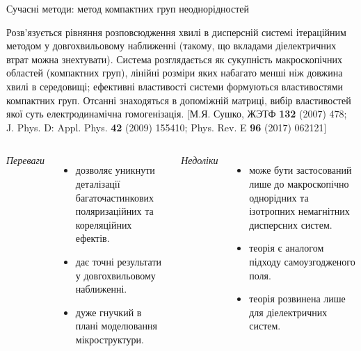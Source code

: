 \documentclass[10pt]{beamer}
\begin{document}
\begin{frame}{Сучасні методи: метод компактних груп неоднорідностей}

\footnotesize
    Розв'язується рівняння розповсюдження хвилі в дисперсній системі ітераційним методом у довгохвильовому наближенні (такому, що вкладами діелектричних втрат можна знехтувати).
    Система розглядається як сукупність макроскопічних областей (компактних груп), лінійні розміри яких набагато менші ніж довжина хвилі в середовищі; ефективні властивості системи формуються властивостями компактних груп.
    Отсанні знаходяться в допоміжній матриці, вибір властивостей якої суть електродинамічна гомогенізація.
    [М.Я. Сушко, ЖЭТФ {\bf 132} (2007) 478; J. Phys. D: Appl. Phys. {\bf 42} (2009) 155410; Phys. Rev. E {\bf 96} (2017) 062121]
    \vspace{-5pt}
    \begin{columns}[T,onlytextwidth]
          \begin{center}
          {\it Переваги}
          \end{center}
          \vspace{-10pt}
          \begin{itemize}
              \item дозволяє уникнути деталізації багаточастинкових поляризаційних та кореляційних ефектів.
              \item дає точні результати у довгохвильовому наближенні.
              \item дуже гнучкий в плані моделювання мікроструктури.
          \end{itemize}
    
          \begin{center}
          {\it Недоліки}
          \end{center}
          \vspace{-10pt}
          \begin{itemize}
              \item може бути застосований лише до макроскопічно однорідних та ізотропних немагнітних дисперсних систем.
              \item теорія є аналогом підходу самоузгодженого поля.
              \item теорія розвинена лише для діелектричних систем.
          \end{itemize}
    \end{columns}

\end{frame}
\end{document}
